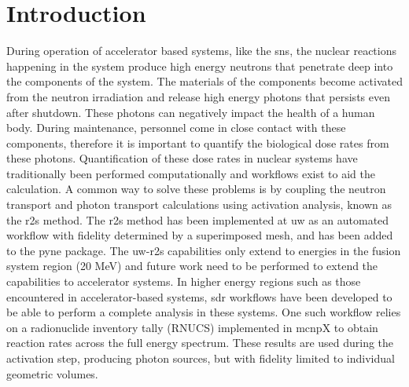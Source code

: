\section{Introduction}\label{sc:intro}
During operation of accelerator based systems, like the \gls{sns},
the nuclear reactions happening in the system produce high
energy neutrons that penetrate deep into the components of the system.
The materials of the components become activated from the neutron irradiation
and release high energy photons that persists even after shutdown. These
photons can negatively impact the health of a human body. During maintenance,
personnel come in close contact with these components, therefore it is
important to quantify the biological dose rates from these photons.
Quantification of these dose rates in nuclear systems have traditionally been
performed computationally and workflows exist to aid the calculation.
A common way to solve these problems is by coupling the neutron transport and
photon transport calculations using activation analysis, known as the \gls{r2s}
method. The \gls{r2s} method has been implemented at \gls{uw} as an automated
workflow with fidelity determined by a superimposed mesh, and has been added
to the \gls{pyne} package. The \gls{uw}-\gls{r2s} capabilities
only extend to energies in the fusion system region (20 MeV) and future work
need to be performed to extend the capabilities to accelerator systems.
In higher energy regions such as those encountered in accelerator-based
systems, \gls{sdr} workflows have been developed to be able to perform a complete
analysis in these systems. One such workflow relies on a radionuclide
inventory tally (RNUCS) implemented in \gls{mcnp}X to obtain reaction rates across
the full energy spectrum.  These results are used during the activation step,
producing photon sources, but with fidelity limited to individual geometric
volumes.
\newpage
